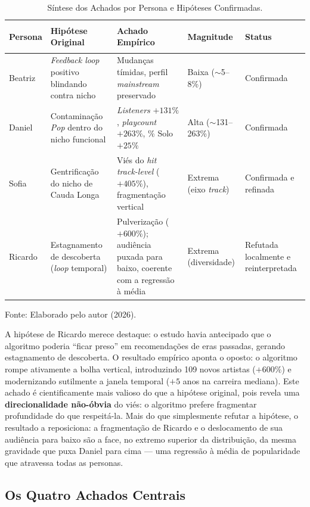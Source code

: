 \documentclass[12pt, %
openright,
oneside, %
a4paper,    %
english,   %
brazil]{facom-ufu-abntex2}
\newcommand{\fontefig}[1]{%
  \par\nopagebreak\vspace{0.15cm}%
  {\centering\footnotesize Fonte: #1\par}%
}
\begin{document}
\begin{table}[H]
\centering
\caption{Síntese dos Achados por Persona e Hipóteses Confirmadas.}
\label{tab:sintese}
\footnotesize
\begin{tabularx}{\textwidth}{>{\bfseries\raggedright\arraybackslash}p{1.5cm} X X >{\centering\arraybackslash}p{1.8cm} >{\centering\arraybackslash}p{2.2cm}}
\toprule
\textbf{Persona} & \textbf{Hipótese Original} & \textbf{Achado Empírico} & \textbf{Magnitude} & \textbf{Status} \\
\midrule
Beatriz & \emph{Feedback loop} positivo blindando contra nicho & Mudanças tímidas, perfil \emph{mainstream} preservado & Baixa ($\sim$5--8\%) & Confirmada \\
Daniel & Contaminação \emph{Pop} dentro do nicho funcional & \emph{Listeners} $+131\%$, \emph{playcount} $+263\%$, \% Solo $+25\%$ & Alta ($\sim$131--263\%) & Confirmada \\
Sofia & Gentrificação do nicho de Cauda Longa & Viés do \emph{hit track-level} ($+405\%$), fragmentação vertical & Extrema (eixo \emph{track}) & Confirmada e refinada \\
Ricardo & Estagnamento de descoberta (\emph{loop} temporal) & Pulverização ($+600\%$); audiência puxada para baixo, coerente com a regressão à média & Extrema (diversidade) & Refutada localmente e reinterpretada \\
\bottomrule
\end{tabularx}
\fontefig{Elaborado pelo autor (2026).}
\end{table}

A hipótese de Ricardo merece destaque: o estudo havia antecipado que o algoritmo
poderia ``ficar preso'' em recomendações de eras passadas, gerando estagnamento de
descoberta. O resultado empírico aponta o oposto: o algoritmo rompe ativamente a
bolha vertical, introduzindo 109 novos artistas ($+600\%$) e modernizando
sutilmente a janela temporal ($+5$ anos na carreira mediana). Este achado é
cientificamente mais valioso do que a hipótese original, pois revela uma
\textbf{direcionalidade não-óbvia} do viés: o algoritmo prefere fragmentar
profundidade do que respeitá-la. Mais do que simplesmente refutar a hipótese, o
resultado a reposiciona: a fragmentação de Ricardo e o deslocamento de sua
audiência para baixo são a face, no extremo superior da distribuição, da mesma
gravidade que puxa Daniel para cima --- uma regressão à média de popularidade que
atravessa todas as personas.

\subsection{Os Quatro Achados Centrais}
\end{document}
